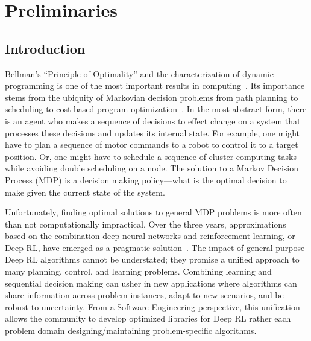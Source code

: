\setcounter{secnumdepth}{0}
\chapter{Preliminaries}
\section{Introduction}
Bellman's ``Principle of Optimality'' and the characterization of dynamic programming is one of the most important results in computing~\cite{bellman2013dynamic}. Its importance stems from the ubiquity of Markovian decision problems from path planning to scheduling to cost-based program optimization~\cite{howard1966dynamic}. In the most abstract form, there is an agent who makes a sequence of decisions to effect change on a system that processes these decisions and updates its internal state. For example, one might have to plan a sequence of motor commands to a robot to control it to a target position. Or, one might have to schedule a sequence of cluster computing tasks while avoiding double scheduling on a node. 
The solution to a Markov Decision Process (MDP) is a decision making policy---what is the optimal decision to make given the current state of the system. 

Unfortunately, finding optimal solutions to general MDP problems is more often than not computationally impractical. Over the three years, approximations based on the combination deep neural networks and reinforcement learning, or Deep RL, have emerged as a pragmatic solution~\cite{mnih2015human,silver2017mastering}. The impact of general-purpose Deep RL algorithms cannot be understated; they promise a unified approach to many planning, control, and learning problems. 
Combining learning and sequential decision making can usher in new applications where algorithms can share information across problem instances, adapt to new scenarios, and be robust to uncertainty.
From a Software Engineering perspective, this unification allows the community to develop optimized libraries for Deep RL rather each problem domain designing/maintaining problem-specific algorithms.

